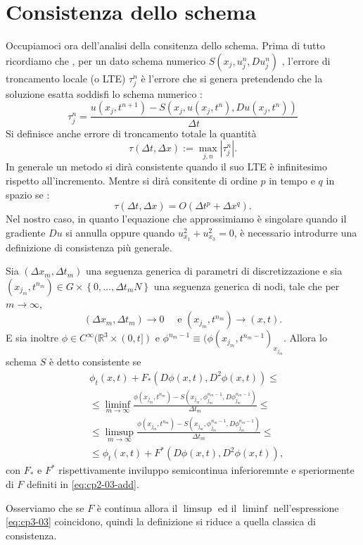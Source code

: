 \section{Consistenza dello schema}
Occupiamoci ora dell'analisi della consitenza dello schema. Prima di tutto ricordiamo che , per un dato schema numerico $S(x_j,u_j^n,Du_j^n)$ , l'errore di troncamento locale (o LTE) $\tau_j^n$ è l'errore che si genera pretendendo che la soluzione esatta soddisfi lo schema numerico :
\[
\tau_j^n=\frac{u(x_j,t^{n+1})-S(x_j,u(x_j,t^n),Du(x_j,t^n))}{\Delta t}
\]
Si definisce anche errore di troncamento totale la quantità
\[
\tau(\Delta t,\Delta x) := \max_{j,n} |\tau_j^n|.
\]
In generale un metodo si dirà consistente quando il suo LTE è infinitesimo rispetto all'incremento. Mentre si dirà consitente di ordine $p$ in tempo e $q$ in spazio se :
\[
\tau(\Delta t,\Delta x) = O(\Delta t^p +\Delta x^q).
\] 
Nel nostro caso, in quanto l'equazione che approssimiamo è singolare quando il gradiente  $Du$ si annulla oppure quando $u_{x_1}^2+u_{x_3}^2=0$, è necessario introdurre una definizione di consistenza più generale.
\begin{definizione}
Sia $(\Delta x_m,\Delta t_m)$ una seguenza generica di parametri di discretizzazione e sia $(x_{j_m},t^{n_m})\in G\times\left\{0,\dots,\Delta t_mN\right\}$ una seguenza generica di nodi, tale che per $m\to\infty$,
\[
(\Delta x_m,\Delta t_m)\to0 \quad\text{ e } (x_{j_m},t^{n_m})\to(x,t).
\]
E sia inoltre $\phi\in C^{\infty}(\mathbb{R}^3\times(0,t])$ e $\phi^{n_m-1}\equiv(\phi(x_{j_m},t^{n_m-1})_{x_{j_m}}$. Allora lo schema $S$ è detto consistente se
\begin{equation}
\label{eq:cp3-03}
\begin{split}
&\phi_t(x,t)+F_*(D\phi(x,t),D^2\phi(x,t))\le \\
&\le\liminf_{m\to\infty}\frac{\phi(x_{j_m},t^{n_m})-S(x_{j_m},\phi_{j_m}^{n_m-1},D\phi_{j_m}^{n_m-1})}{\Delta t_m}\le \\
&\le\limsup_{m\to\infty}\frac{\phi(x_{j_m},t^{n_m})-S(x_{j_m},\phi_{j_m}^{n_m-1},D\phi_{j_m}^{n_m-1})}{\Delta t_m}\le \\
&\le\phi_t(x,t)+F^*(D\phi(x,t),D^2\phi(x,t)),
\end{split}
\end{equation}
con $F_*$ e $F^*$ rispettivamente inviluppo semicontinua inferioremnte
e speriormente di $F$ definiti in \ref{eq:cp2-03-add}.
\end{definizione}
\begin{osservazione}
Osserviamo che se $F$ è continua allora il $\limsup$ ed il $\liminf$ nell'espressione \eqref{eq:cp3-03} coincidono, quindi la definizione si riduce a quella classica di consistenza.
\end{osservazione}

